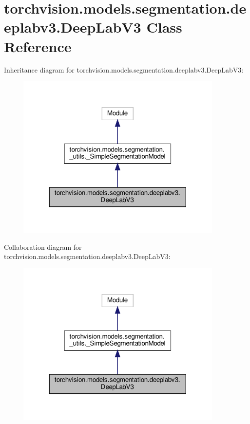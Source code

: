 \hypertarget{classtorchvision_1_1models_1_1segmentation_1_1deeplabv3_1_1DeepLabV3}{}\section{torchvision.\+models.\+segmentation.\+deeplabv3.\+Deep\+Lab\+V3 Class Reference}
\label{classtorchvision_1_1models_1_1segmentation_1_1deeplabv3_1_1DeepLabV3}


Inheritance diagram for torchvision.\+models.\+segmentation.\+deeplabv3.\+Deep\+Lab\+V3\+:
\nopagebreak
\begin{figure}[H]
\begin{center}
\leavevmode
\includegraphics[width=290pt]{classtorchvision_1_1models_1_1segmentation_1_1deeplabv3_1_1DeepLabV3__inherit__graph}
\end{center}
\end{figure}


Collaboration diagram for torchvision.\+models.\+segmentation.\+deeplabv3.\+Deep\+Lab\+V3\+:
\nopagebreak
\begin{figure}[H]
\begin{center}
\leavevmode
\includegraphics[width=290pt]{classtorchvision_1_1models_1_1segmentation_1_1deeplabv3_1_1DeepLabV3__coll__graph}
\end{center}
\end{figure}
